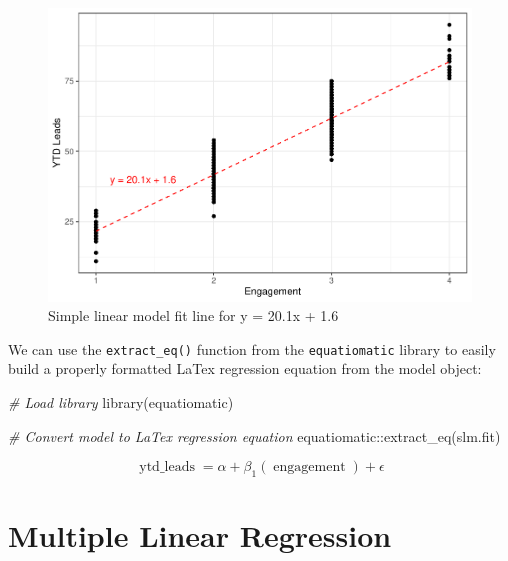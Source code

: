 \documentclass[
]{book}
\newenvironment{Shaded}{\begin{snugshade}}{\end{snugshade}}
\newcommand{\CommentTok}[1]{\textcolor[rgb]{0.56,0.35,0.01}{\textit{#1}}}
\newcommand{\FunctionTok}[1]{\textcolor[rgb]{0.00,0.00,0.00}{#1}}
\newcommand{\NormalTok}[1]{#1}
\newcommand{\SpecialCharTok}[1]{\textcolor[rgb]{0.00,0.00,0.00}{#1}}
\begin{document}
\begin{figure}

{\centering \includegraphics[width=1\linewidth]{The_Fundamentals_of_People_Analytics_files/figure-latex/slm-fit-1} 

}

\caption{Simple linear model fit line for y = 20.1x + 1.6}\label{fig:slm-fit}
\end{figure}

We can use the \texttt{extract\_eq()} function from the \texttt{equatiomatic} library to easily build a properly formatted LaTex regression equation from the model object:

\begin{Shaded}
\begin{Highlighting}[]
\CommentTok{\# Load library}
\FunctionTok{library}\NormalTok{(equatiomatic)}

\CommentTok{\# Convert model to LaTex regression equation}
\NormalTok{equatiomatic}\SpecialCharTok{::}\FunctionTok{extract\_eq}\NormalTok{(slm.fit)}
\end{Highlighting}
\end{Shaded}

\begin{equation}
\operatorname{ytd\_leads} = \alpha + \beta_{1}(\operatorname{engagement}) + \epsilon
\end{equation}

\hypertarget{multiple-linear-regression}{%
\section{Multiple Linear Regression}\label{multiple-linear-regression}}
\end{document}
